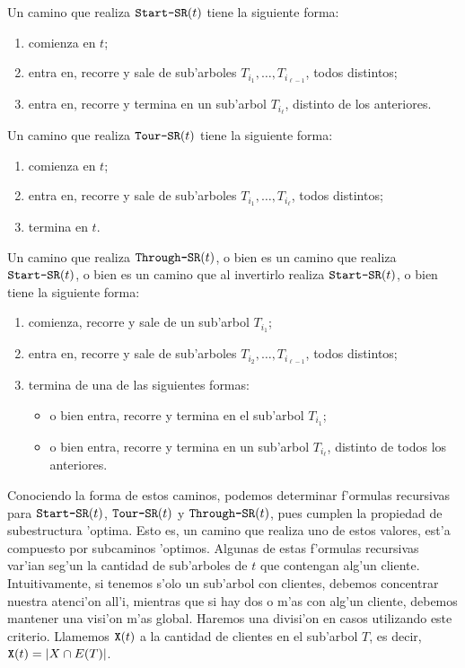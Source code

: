 \begin{corollary}
Un camino que realiza $\texttt{Start-SR}(t)$ tiene la siguiente forma:

\begin{enumerate}
\item comienza en $t$;
\item entra en, recorre y sale de sub'arboles $T_{i_1}, \dots, T_{i_{\ell - 1}}$, todos distintos;
\item entra en, recorre y termina en un sub'arbol $T_{i_{\ell}}$, distinto de los anteriores.
\end{enumerate}
\end{corollary}

\begin{corollary}
Un camino que realiza $\texttt{Tour-SR}(t)$ tiene la siguiente forma:

\begin{enumerate}
\item comienza en $t$;
\item entra en, recorre y sale de sub'arboles $T_{i_1}, \dots, T_{i_{\ell}}$, todos distintos;
\item termina en $t$.
\end{enumerate}
\end{corollary}

\begin{corollary}
Un camino que realiza $\texttt{Through-SR}(t)$, o bien es un camino que realiza $\texttt{Start-SR}(t)$, o bien es un camino que al invertirlo realiza $\texttt{Start-SR}(t)$, o bien tiene la siguiente forma:

\begin{enumerate}
\item comienza, recorre y sale de un sub'arbol $T_{i_1}$;
\item entra en, recorre y sale de sub'arboles $T_{i_2}, \dots, T_{i_{\ell - 1}}$, todos distintos;
\item termina de una de las siguientes formas:
\begin{itemize}
\item o bien entra, recorre y termina en el sub'arbol $T_{i_1}$;
\item o bien entra, recorre y termina en un sub'arbol $T_{i_{\ell}}$, distinto de todos los anteriores.
\end{itemize}
\end{enumerate}
\end{corollary}

Conociendo la forma de estos caminos, podemos determinar f'ormulas recursivas para $\texttt{Start-SR}(t)$, $\texttt{Tour-SR}(t)$ y $\texttt{Through-SR}(t)$, pues cumplen la propiedad de subestructura 'optima. Esto es, un camino que realiza uno de estos valores, est'a compuesto por subcaminos 'optimos. Algunas de estas f'ormulas recursivas var'ian seg'un la cantidad de sub'arboles de $t$ que contengan alg'un cliente. Intuitivamente, si tenemos s'olo un sub'arbol con clientes, debemos concentrar nuestra atenci'on all'i, mientras que si hay dos o m'as con alg'un cliente, debemos mantener una visi'on m'as global. Haremos una divisi'on en casos utilizando este criterio. Llamemos $\texttt{X}(t)$ a la cantidad de clientes en el sub'arbol $T$, es decir, $\texttt{X}(t) = |X \cap E(T)|$.

